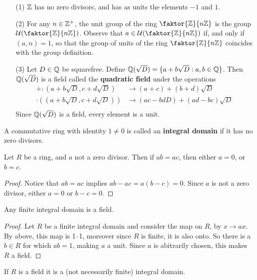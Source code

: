 \begin{example}\label{example_5.3}
  \begin{enumerate}
    \item[(1)] $\mathbb{Z}$ has no zero divisors, and has as units the elements $-1$
      and $1$.


    \item[(2)] For any $n \in \mathbb{Z}^+$, the unit group of the ring
      $\faktor{\Z}{n\Z}$ is the group $\Uc{(\faktor{\Z}{n\Z})}$.
      Observe that $a \in \Uc{(\faktor{\Z}{n\Z})}$ if, and only if
      $(a,n)=1$, so that the group of units of the ring
      $\faktor{\Z}{n\Z}$ coincides with the group definition.

    \item[(3)] Let $D \in \mathbb{Q}$ be squarefree. Define
      $\mathbb{Q}(\sqrt{D})=\{a+b\sqrt{D} : a,b \in \mathbb{Q}\}$. Then $\mathbb{Q}(\sqrt{D})$ is
      a field called the \textbf{quadratic field} under the operations
      \begin{align*}
        +:(a+b\sqrt{D}, c+d\sqrt{D})    & \xrightarrow{} (a+c)+(b+d)\sqrt{D} \\
        \cdot((a+b\sqrt{D}, c+d\sqrt{D}))   &   \xrightarrow{}
        (ac-bdD)+(ad-bc)\sqrt{D} \\
      \end{align*}
      Since $\mathbb{Q}(\sqrt{D})$ is a field, every element is a unit.
  \end{enumerate}
\end{example}

\begin{definition}
  A commutative ring with identity $1 \neq 0$ is called an \textbf{integral
  domain} if it has no zero divisors.
\end{definition}

\begin{lemma}\label{lemma_5.1.3}
  Let $R$ be a ring, and $a$ not a zero divisor. Then if $ab=ac$, then either
  $a=0$, or  $b=c$.
\end{lemma}
\begin{proof}
  Notice that $ab=ac$ implies  $ab-ac=a(b-c)=0$. Since $a$ is not a zero
  divisor, either  $a=0$ or  $b-c=0$.
\end{proof}
\begin{corollary}
  Any finite integral domain is a field.
\end{corollary}
\begin{proof}
  Let $R$ be a finite integral domain and consider the map on $R$, by $x
  \xrightarrow{} ax$. By above, this map is 1--1, moreover since $R$ is
  finite, it is also onto. So there is a $b \in R$ for which $ab=1$, making
  $a$ a unit. Since $a$ is abitrarily chosen, this makes $R$ a field.
\end{proof}
\begin{corollary}
  If $R$ is a field it is a (not necessarily finite) integral domain.
\end{corollary}

